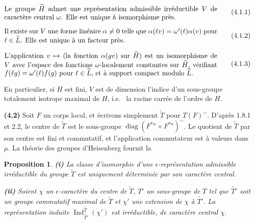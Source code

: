 \documentclass[12pt,a4paper]{article}
\theoremstyle{plain}
\newtheorem{proposition}[theorem]{Proposition}
\theoremstyle{definition}
\theoremstyle{remark}
\DeclareMathOperator{\Ind}{Ind}
\DeclareMathOperator{\diag}{diag}
\newcommand{\wt}{\widetilde}
\begin{document}
\begin{equation}\label{eq:4.1.1}
\parbox{0.9\textwidth}{
Le groupe $\wt{H}$ admet une représentation admissible irréductible $V$ de caractère central $\omega$. Elle est unique à isomorphisme près.
}
\tag{4.1.1}
\end{equation}

\begin{equation}\label{eq:4.1.2}
\parbox{0.9\textwidth}{
Il existe sur $V$ une forme linéaire $\alpha \neq 0$ telle que $\alpha(\ell v) = \omega'(\ell) \alpha(v)$ pour $\ell \in \wt{L}$. Elle est unique à un facteur près.
}
\tag{4.1.2}
\end{equation}

\begin{equation}\label{eq:4.1.3}
\parbox{0.9\textwidth}{
L'application $v \mapsto$ (la fonction $\alpha(gv)$ sur $\wt{H}$) est un isomorphisme de $V$ avec l'espace des fonctions $\omega$-localement constantes sur $\wt{H}$, vérifiant $f(\ell g) = \omega'(\ell) f(g)$ pour $\ell \in \wt{L}$, et à support compact modulo $\wt{L}$.
}
\tag{4.1.3}
\end{equation}

En particulier, si $H$ est fini, $V$ est de dimension l'indice d'un sous-groupe totalement isotrope maximal de $H$, i.e.
\ la racine carrée de l'ordre de $H$.

\textbf{(4.2)} Soit $F$ un corps local, et écrivons simplement $\wt{T}$ pour $T(F)^\sim$. D'après 1.8.1 et 2.2, le centre de $\wt{T}$ est le sous-groupe $\diag(F^{*n} \times F^{*n})^\sim$. Le quotient de $\wt{T}$ par son centre est fini et commutatif, et l'application commutateur est à valeurs dans $\mu$. La théorie des groupes d'Heisenberg fournit la

\begin{proposition}\label{prop:4.3}
\textbf{(i)} La classe d'isomorphie d'une $\epsilon$-représentation admissible irréductible du groupe $\wt{T}$ est uniquement déterminée par son caractère central.

\textbf{(ii)} Soient $\chi$ un $\epsilon$-caractère du centre de $\wt{T}$, $T'$ un sous-groupe de $T$ tel que $\wt{T'}$ soit un groupe commutatif maximal de $\wt{T}$ et $\chi'$ une extension de $\chi$ à $\wt{T'}$. La représentation induite $\Ind_{\wt{T'}}^{\wt{T}}(\chi')$ est irréductible, de caractère central $\chi$.
\end{proposition}
\end{document}
